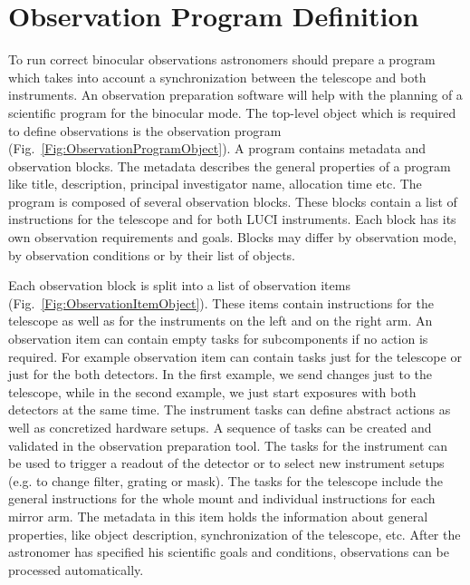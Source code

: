 \documentclass[11pt,twoside]{article}
\begin{document}
\section{Observation Program Definition}

To run correct binocular observations astronomers should prepare a program which takes into account a synchronization 
between the telescope and both instruments. An observation preparation software will help with the planning of a scientific program for 
the binocular mode. 
The top-level object which is required to define observations is the observation program (Fig.~\ref{Fig:ObservationProgramObject}). 
A program contains metadata and observation blocks. 
The metadata describes the general properties of a program like title, description, principal investigator name, allocation time etc. 
The program is composed of several observation blocks. These blocks contain a list of instructions for the telescope and 
for both LUCI instruments. Each block has its own observation requirements and goals. Blocks may differ by observation mode, by observation conditions or 
by their list of objects. 

Each observation block is split into a list of observation items (Fig.~\ref{Fig:ObservationItemObject}). 
These items contain instructions for the
telescope as well as for the instruments on the left and on the right arm. 
An observation item can contain empty tasks for subcomponents if no action is required.
For example observation item can contain tasks just for the telescope or just for the both detectors. 
In the first example, we send changes just to the telescope, while in the second example, we just start exposures with both detectors at the same time.
The instrument tasks
can define abstract actions as well as concretized hardware setups. A sequence of tasks can be
created and validated in the observation preparation tool. 
The tasks for the instrument can be used to
trigger a readout of the detector or to select new instrument setups (e.g. to change filter, grating or
mask). The tasks for the telescope include the general instructions for the whole mount and individual
instructions for each mirror arm. The metadata in this item holds the information about general properties, like
object description, synchronization of the telescope, etc. 
After the astronomer has specified his scientific goals and conditions, observations can be processed
automatically.
\end{document}
